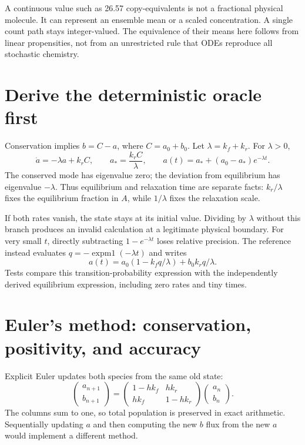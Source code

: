 A continuous value such as 26.57 copy-equivalents is not a fractional physical
molecule. It can represent an ensemble mean or a scaled concentration. A single
count path stays integer-valued. The equivalence of their means here follows from
linear propensities, not from an unrestricted rule that ODEs reproduce all
stochastic chemistry.

\section{Derive the deterministic oracle first}
Conservation implies $b=C-a$, where $C=a_0+b_0$. Let
$\lambda=k_f+k_r$. For $\lambda>0$,
\[
\dot a=-\lambda a+k_rC,\qquad
a_*=\frac{k_rC}{\lambda},\qquad
a(t)=a_*+(a_0-a_*)e^{-\lambda t}.
\]
The conserved mode has eigenvalue zero; the deviation from equilibrium has
eigenvalue $-\lambda$. Thus equilibrium and relaxation time are separate facts:
$k_r/\lambda$ fixes the equilibrium fraction in $A$, while $1/\lambda$ fixes the
relaxation scale.

If both rates vanish, the state stays at its initial value. Dividing by
$\lambda$ without this branch produces an invalid calculation at a legitimate
physical boundary. For very small $t$, directly subtracting
$1-e^{-\lambda t}$ loses relative precision. The reference instead evaluates
$q=-\operatorname{expm1}(-\lambda t)$ and writes
\[
a(t)=a_0(1-k_fq/\lambda)+b_0 k_rq/\lambda.
\]
Tests compare this transition-probability expression with the independently
derived equilibrium expression, including zero rates and tiny times.

\section{Euler's method: conservation, positivity, and accuracy}
Explicit Euler updates both species from the same old state:
\[
\begin{pmatrix}a_{n+1}\\b_{n+1}\end{pmatrix}
=
\begin{pmatrix}
1-hk_f&hk_r\\ hk_f&1-hk_r
\end{pmatrix}
\begin{pmatrix}a_n\\b_n\end{pmatrix}.
\]
The columns sum to one, so total population is preserved in exact arithmetic.
Sequentially updating $a$ and then computing the new $b$ flux from the new $a$
would implement a different method.

